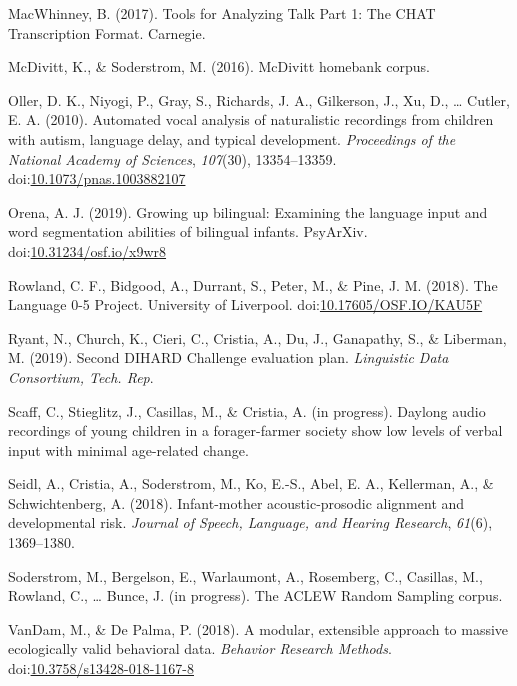 \documentclass[english,floatsintext,man]{apa6}
\begin{document}
\hypertarget{ref-macwhinney2017tools}{}
MacWhinney, B. (2017). Tools for Analyzing Talk Part 1: The CHAT
Transcription Format. Carnegie.

\hypertarget{ref-mcdivitt2016mcdivitt}{}
McDivitt, K., \& Soderstrom, M. (2016). McDivitt homebank corpus.

\hypertarget{ref-Oller}{}
Oller, D. K., Niyogi, P., Gray, S., Richards, J. A., Gilkerson, J., Xu,
D., \ldots{} Cutler, E. A. (2010). Automated vocal analysis of
naturalistic recordings from children with autism, language delay, and
typical development. \emph{Proceedings of the National Academy of
Sciences}, \emph{107}(30), 13354--13359.
doi:\href{https://doi.org/10.1073/pnas.1003882107}{10.1073/pnas.1003882107}

\hypertarget{ref-orena_2019}{}
Orena, A. J. (2019). Growing up bilingual: Examining the language input
and word segmentation abilities of bilingual infants. PsyArXiv.
doi:\href{https://doi.org/10.31234/osf.io/x9wr8}{10.31234/osf.io/x9wr8}

\hypertarget{ref-rowland2018}{}
Rowland, C. F., Bidgood, A., Durrant, S., Peter, M., \& Pine, J. M.
(2018). The Language 0-5 Project. University of Liverpool.
doi:\href{https://doi.org/10.17605/OSF.IO/KAU5F}{10.17605/OSF.IO/KAU5F}

\hypertarget{ref-ryant2019second}{}
Ryant, N., Church, K., Cieri, C., Cristia, A., Du, J., Ganapathy, S., \&
Liberman, M. (2019). Second DIHARD Challenge evaluation plan.
\emph{Linguistic Data Consortium, Tech. Rep}.

\hypertarget{ref-scaff}{}
Scaff, C., Stieglitz, J., Casillas, M., \& Cristia, A. (in progress).
Daylong audio recordings of young children in a forager-farmer society
show low levels of verbal input with minimal age-related change.

\hypertarget{ref-Seidl2018}{}
Seidl, A., Cristia, A., Soderstrom, M., Ko, E.-S., Abel, E. A.,
Kellerman, A., \& Schwichtenberg, A. (2018). Infant-mother
acoustic-prosodic alignment and developmental risk. \emph{Journal of
Speech, Language, and Hearing Research}, \emph{61}(6), 1369--1380.

\hypertarget{ref-soderstrom}{}
Soderstrom, M., Bergelson, E., Warlaumont, A., Rosemberg, C., Casillas,
M., Rowland, C., \ldots{} Bunce, J. (in progress). The ACLEW Random
Sampling corpus.

\hypertarget{ref-VanDam2018}{}
VanDam, M., \& De Palma, P. (2018). A modular, extensible approach to
massive ecologically valid behavioral data. \emph{Behavior Research
Methods}.
doi:\href{https://doi.org/10.3758/s13428-018-1167-8}{10.3758/s13428-018-1167-8}
\end{document}
